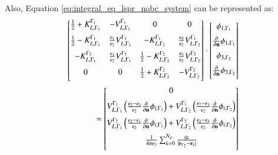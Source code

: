 %
Also, Equation \eqref{eq:integral_eq_lspr_nobc_system} can be represented as:
%
\begin{align} \label{eq:matrix_multi}
 \left[
    \begin{matrix} 
       \frac{1}{2}+K_{L, \Gamma_1}^{\Gamma_1} & -V_{L, \Gamma_1}^{\Gamma_1} & 0 &  0   \vspace{0.2cm} \\
       \frac{1}{2}-K_{L, \Gamma_1}^{\Gamma_1} & \frac{\epsilon_1}{\epsilon_2} V_{L, \Gamma_1}^{\Gamma_1} & -K_{L, \Gamma_2}^{\Gamma_1} & \frac{\epsilon_3}{\epsilon_2} V_{L, \Gamma_2}^{\Gamma_1} \vspace{0.2cm}  \\
        -K_{L, \Gamma_1}^{\Gamma_2}&\frac{\epsilon_1}{\epsilon_2} V_{L, \Gamma_1}^{\Gamma_2} & \frac{1}{2}-K_{L, \Gamma_2}^{\Gamma_2}  &  \frac{\epsilon_3}{\epsilon_2} V_{L, \Gamma_2}^{\Gamma_2} \vspace{0.2cm} \\
       0 & 0 & \frac{1}{2}+K_{L, \Gamma_2}^{\Gamma_2}&  - V_{L, \Gamma_2}^{\Gamma_2}   \vspace{0.2cm} \\
    \end{matrix}
    \right] 
\cdot
 \left[
    \begin{matrix}
    \phi_{1,\Gamma_1} \vspace{0.2cm} \\
    \frac{\partial}{\partial \mathbf{n}} \phi_{1,\Gamma_1} \vspace{0.2cm} \\
    \phi_{3,\Gamma_2} \vspace{0.2cm} \\
    \frac{\partial}{\partial \mathbf{n}} \phi_{3,\Gamma_2} \vspace{0.2cm} \\
    \end{matrix}
\right]&
 \nonumber \\
 = \left[
    \begin{matrix}
    0 \vspace{0.2cm} \\
    V_{L,\Gamma_1}^{\Gamma_1} \left(\frac{\epsilon_2-\epsilon_1}{\epsilon_2}\frac{\partial}{\partial \mathbf{n}}\phi_{i,\Gamma_1} \right)
    + V_{L,\Gamma_2}^{\Gamma_1} \left(\frac{\epsilon_2 -\epsilon_3}{\epsilon_2}\frac{\partial}{\partial \mathbf{n}}\phi_{i,\Gamma_2} \right)
    \vspace{0.2cm}\\
    V_{L,\Gamma_1}^{\Gamma_2} \left(\frac{\epsilon_2-\epsilon_1}{\epsilon_2}\frac{\partial}{\partial \mathbf{n}}\phi_{i,\Gamma_1} \right)
    + V_{L,\Gamma_2}^{\Gamma_2} \left(\frac{\epsilon_2 -\epsilon_3}{\epsilon_2}\frac{\partial}{\partial \mathbf{n}}\phi_{i,\Gamma_2} \right)
    \vspace{0.2cm}\\
    \frac{1}{4\pi\epsilon_3}\sum_{k=0}^{N_q} \frac{q_k}{|\mathbf{r}_{\Gamma_2} - \mathbf{r}_k|} \vspace{0.2cm}  \\
    \end{matrix}
\right]&
\end{align}
